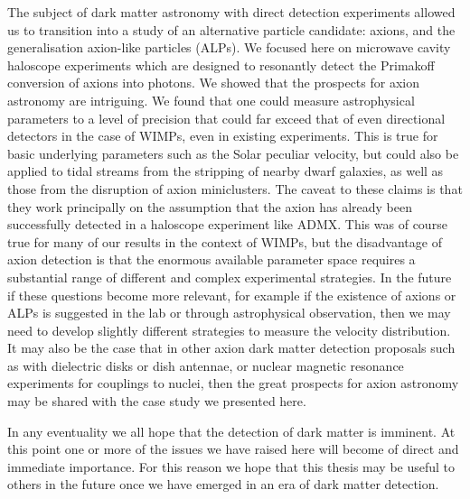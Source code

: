 The subject of dark matter astronomy with direct detection experiments allowed us to transition into a study of an alternative particle candidate: axions, and the generalisation axion-like particles (ALPs). We focused here on microwave cavity haloscope experiments which are designed to resonantly detect the Primakoff conversion of axions into photons. We showed that the prospects for axion astronomy are intriguing. We found that one could measure astrophysical parameters to a level of precision that could far exceed that of even directional detectors in the case of WIMPs, even in existing experiments. This is true for basic underlying parameters such as the Solar peculiar velocity, but could also be applied to tidal streams from the stripping of nearby dwarf galaxies, as well as those from the disruption of axion miniclusters. The caveat to these claims is that they work principally on the assumption that the axion has already been successfully detected in a haloscope experiment like ADMX. This was of course true for many of our results in the context of WIMPs, but the disadvantage of axion detection is that the enormous available parameter space requires a substantial range of different and complex experimental strategies. In the future if these questions become more relevant, for example if the existence of axions or ALPs is suggested in the lab or through astrophysical observation, then we may need to develop slightly different strategies to measure the velocity distribution. It may also be the case that in other axion dark matter detection proposals such as with dielectric disks or dish antennae, or nuclear magnetic resonance experiments for couplings to nuclei, then the great prospects for axion astronomy may be shared with the case study we presented here.

In any eventuality we all hope that the detection of dark matter is imminent. At this point one or more of the issues we have raised here will become of direct and immediate importance. For this reason we hope that this thesis may be useful to others in the future once we have emerged in an era of dark matter detection.


